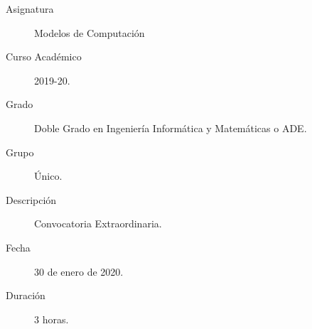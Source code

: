 \documentclass[12pt]{article}
\begin{document}

    
    

    \begin{description}
        \item[Asignatura] Modelos de Computación
        \item[Curso Académico] 2019-20.
        \item[Grado] Doble Grado en Ingeniería Informática y Matemáticas o ADE.
        \item[Grupo] Único.
        \item[Descripción] Convocatoria Extraordinaria.
        \item[Fecha] 30 de enero de 2020.
        \item[Duración] $3$ horas.    
    \end{description}
    \newpage
\end{document}
